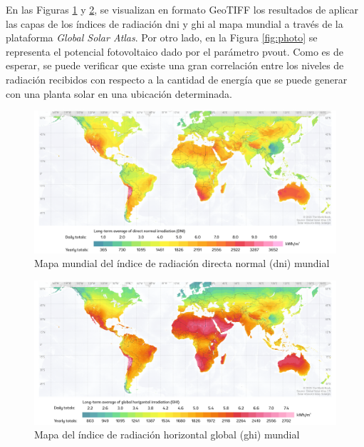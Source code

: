 En las Figuras \ref{fig:dni} y \ref{fig:ghi}, se visualizan en formato GeoTIFF los resultados de aplicar las capas de los índices de radiación \gls{dni} y \gls{ghi} al mapa mundial a través de la plataforma \textit{Global Solar Atlas}. Por otro lado, en la Figura \ref{fig:photo} se representa el potencial fotovoltaico dado por el parámetro \gls{pvout}. Como es de esperar, se puede verificar que existe una gran correlación entre los niveles de radiación recibidos con respecto a la cantidad de energía que se puede generar con una planta solar en una ubicación determinada. 

\vspace{3mm}

\begin{figure}[H]
    \centering
    \includegraphics[width=1\textwidth]{img/diseno/dni.png}
    \caption{Mapa mundial del índice de radiación directa normal (\acrshort{dni}) mundial \cite{globalsolar}}
    \label{fig:dni}
\end{figure}

\vspace{3mm}

\begin{figure}[H]
    \centering
    \includegraphics[width=1\textwidth]{img/diseno/ghi.png}
    \caption{Mapa del índice de radiación horizontal global (\acrshort{ghi}) mundial \cite{globalsolar}}
    \label{fig:ghi}
\end{figure}


